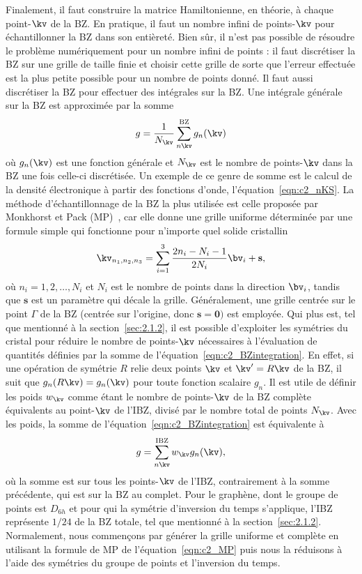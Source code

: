 Finalement, il faut construire la matrice Hamiltonienne, en théorie, à chaque point-$\kv$ de la BZ. En pratique, il faut un nombre infini de points-$\kv$ pour échantillonner la BZ dans son entièreté. Bien sûr, il n'est pas possible de résoudre le problème numériquement pour un nombre infini de points : il faut discrétiser la BZ sur une grille de taille finie et choisir cette grille de sorte que l'erreur effectuée est la plus petite possible pour un nombre de points donné. Il faut aussi discrétiser la BZ pour effectuer des intégrales sur la BZ. Une intégrale générale sur la BZ est approximée par la somme
\begin{equation}
    g = \frac{1}{N_\kv}\sum_{n\kv}^\text{BZ}g_n(\kv)
    \label{eqn:c2_BZintegration}
\end{equation}
où $g_n(\kv)$ est une fonction générale et $N_\kv$ est le nombre de points-$\kv$ dans la BZ une fois celle-ci discrétisée. Un exemple de ce genre de somme est le calcul de la densité électronique à partir des fonctions d'onde, l'équation~\eqref{eqn:c2_nKS}. La méthode d'échantillonnage de la BZ la plus utilisée est celle proposée par Monkhorst et Pack (MP)~\cite{monkhorstSpecialPointsBrillouinzone1976}, car elle donne une grille uniforme déterminée par une formule simple qui fonctionne pour n'importe quel solide cristallin
\begin{equation}
    \kv_{n_1,n_2,n_3}=\sum_{i=1}^3\frac{2n_i-N_i-1}{2N_i}\bv_i +\mathbf{s},
    \label{eqn:c2_MP}
\end{equation}
où $n_i =1,2,\dots, N_i$ et $N_i$ est le nombre de points dans la direction $\bv_i$, tandis que $\mathbf{s}$ est un paramètre qui décale la grille. Généralement, une grille centrée sur le point $\Gamma$ de la BZ (centrée sur l'origine, donc $\mathbf{s}=\mathbf{0})$ est employée. Qui plus est, tel que mentionné à la section~\ref{sec:2.1.2}, il est possible d'exploiter les symétries du cristal pour réduire le nombre de points-$\kv$ nécessaires à l'évaluation de quantités définies par la somme de l'équation~\eqref{eqn:c2_BZintegration}. En effet, si une opération de symétrie $R$ relie deux points $\kv$  et $\kv'=R\kv$ de la BZ, il suit que $g_n(R\kv)=g_n(\kv)$ pour toute fonction scalaire $g_n$. Il est utile de définir les poids $w_\kv$ comme étant le nombre de points-$\kv$ de la BZ complète équivalents au point-$\kv$ de l'IBZ, divisé par le nombre total de points $N_\kv$. Avec les poids, la somme de l'équation~\eqref{eqn:c2_BZintegration} est équivalente à 
\begin{equation}
    g = \sum_{n\kv}^{\text{IBZ}}w_\kv g_n(\kv),
    \label{eqn:c2_IBZintegration}
\end{equation}
où la somme est sur tous les points-$\kv$ de l'IBZ, contrairement à la somme précédente, qui est sur la BZ au complet. Pour le graphène, dont le groupe de points est $D_{6h}$ et pour qui la symétrie d'inversion du temps s'applique, l'IBZ représente $1/24$ de la BZ totale, tel que mentionné à la section~\ref{sec:2.1.2}. Normalement, nous commençons par générer la grille uniforme et complète en utilisant la formule de MP de l'équation~\eqref{eqn:c2_MP} puis nous la réduisons à l'aide des symétries du groupe de points et l'inversion du temps.

